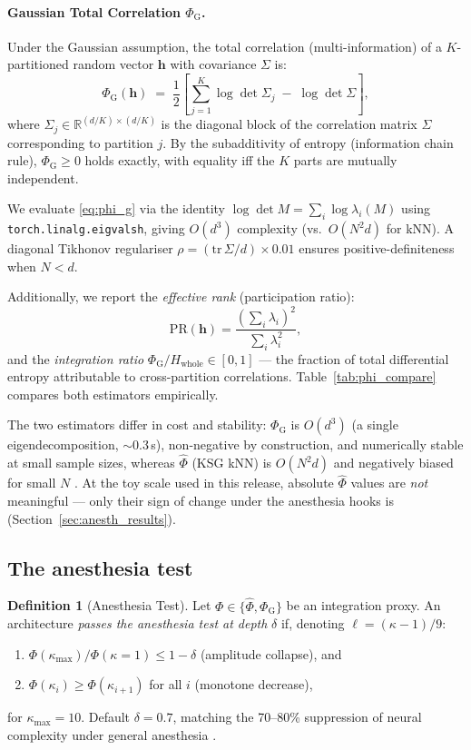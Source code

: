 \documentclass[11pt]{article}
\theoremstyle{definition}
\newtheorem{definition}{Definition}[section]
\newcommand{\RR}{\mathbb{R}}
\newcommand{\vh}{\mathbf{h}}
\newcommand{\phihat}{\hat{\Phi}}
\newcommand{\phig}{\Phi_{\mathrm{G}}}
\begin{document}
\paragraph{Gaussian Total Correlation $\phig$.}
Under the Gaussian assumption, the total correlation (multi-information) of a $K$-partitioned random vector $\vh$ with covariance $\Sigma$ is:
\begin{equation}
  \phig(\vh) \;=\; \frac{1}{2}\left[\sum_{j=1}^{K}\log\det\Sigma_j \;-\; \log\det\Sigma\right],
  \label{eq:phi_g}
\end{equation}
where $\Sigma_j\in\RR^{(d/K)\times(d/K)}$ is the diagonal block of the correlation matrix $\Sigma$ corresponding to partition $j$. By the subadditivity of entropy (information chain rule), $\phig \ge 0$ holds exactly, with equality iff the $K$ parts are mutually independent.

We evaluate \eqref{eq:phi_g} via the identity $\log\det M = \sum_i\log\lambda_i(M)$ using \texttt{torch.linalg.eigvalsh}, giving $O(d^3)$ complexity (vs.\ $O(N^2 d)$ for kNN). A diagonal Tikhonov regulariser $\rho = (\mathrm{tr}\,\Sigma / d)\times 0.01$ ensures positive-definiteness when $N < d$.

Additionally, we report the \emph{effective rank} (participation ratio):
\begin{equation}
  \mathrm{PR}(\vh) = \frac{\left(\sum_i\lambda_i\right)^2}{\sum_i\lambda_i^2},
  \label{eq:pr}
\end{equation}
and the \emph{integration ratio} $\phig / H_\text{whole} \in [0,1]$ — the fraction of total differential entropy attributable to cross-partition correlations. Table~\ref{tab:phi_compare} compares both estimators empirically.

The two estimators differ in cost and stability: $\phig$ is $O(d^3)$ (a single eigendecomposition, $\sim$0.3\,s), non-negative by construction, and numerically stable at small sample sizes, whereas $\phihat$ (KSG kNN) is $O(N^2 d)$ and negatively biased for small $N$ \citep{lord2018geometric}. At the toy scale used in this release, absolute $\hat{\Phi}$ values are \emph{not} meaningful — only their sign of change under the anesthesia hooks is (Section~\ref{sec:anesth_results}).

\subsection{The anesthesia test}
\begin{definition}[Anesthesia Test]
Let $\Phi\in\{\phihat,\phig\}$ be an integration proxy. An architecture \emph{passes the anesthesia test at depth} $\delta$ if, denoting $\ell=(\kappa-1)/9$:
\begin{enumerate}[label=(\roman*),noitemsep]
  \item $\Phi(\kappa_\text{max}) / \Phi(\kappa=1) \le 1 - \delta$ \quad (amplitude collapse), and
  \item $\Phi(\kappa_i) \ge \Phi(\kappa_{i+1})$ for all $i$ \quad (monotone decrease),
\end{enumerate}
for $\kappa_\text{max}=10$. Default $\delta=0.7$, matching the 70--80\% suppression of neural complexity under general anesthesia \citep{casali2013theoretically}.
\end{definition}
\end{document}
